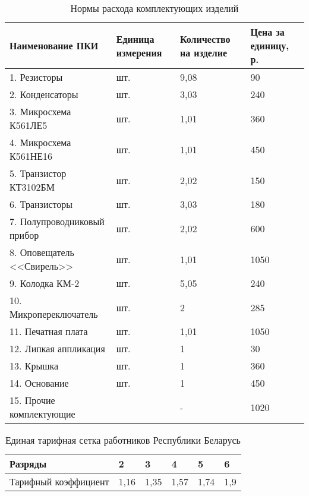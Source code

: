\begin{table}[h!]
  \caption{Нормы расхода комплектующих изделий}
  \label{tbl:set_costs}
  \centering
  \small{
    \begin{tabular}{| p{} | p{} |
                      p{} | p{} |}
      \hline
      Наименование ПКИ & Единица \newline измерения &
      Количество \newline на изделие & Цена за единицу, \newline р. \\ \hline

      1. Резисторы                & шт. & 9,08 & 90   \\ \hline
      2. Конденсаторы             & шт. & 3,03 & 240  \\ \hline
      3. Микросхема К561ЛЕ5       & шт. & 1,01 & 360  \\ \hline
      4. Микросхема К561НЕ16      & шт. & 1,01 & 450  \\ \hline
      5. Транзистор КТ3102БМ      & шт. & 2,02 & 150  \\ \hline
      6. Транзисторы              & шт. & 3,03 & 180  \\ \hline
      7. Полупроводниковый прибор & шт. & 2,02 & 600  \\ \hline
      8. Оповещатель <<Свирель>>  & шт. & 1,01 & 1050 \\ \hline
      9. Колодка КМ-2             & шт. & 5,05 & 240  \\ \hline
      10. Микропереключатель      & шт. & 2    & 285  \\ \hline
      11. Печатная плата          & шт. & 1,01 & 1050 \\ \hline
      12. Липкая аппликация       & шт. & 1    & 30   \\ \hline
      13. Крышка                  & шт. & 1    & 360  \\ \hline
      14. Основание               & шт. & 1    & 450  \\ \hline
      15. Прочие комплектующие    &     & -    & 1020 \\ \hline

    \end{tabular}
  }
\end{table}

\begin{table}[h!]
  \caption{Единая тарифная сетка работников Республики Беларусь}
  \label{tbl:tariffs_grid}
  \centering
  \small{
    \begin{tabular}{| p{} | p{} |
                      p{} | p{} |
                      p{} | p{} |}
      \hline
      Разряды & 2 & 3 & 4 & 5 & 6 \\ \hline

      Тарифный коэффициент & 1,16 & 1,35 & 1,57 & 1,74 & 1,9 \\ \hline

    \end{tabular}
  }
\end{table}

